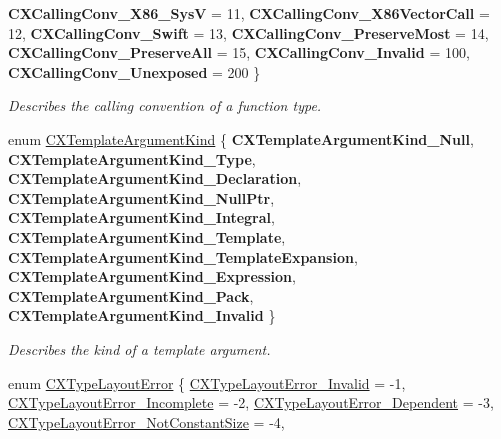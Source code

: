 \begin{DoxyCompactItemize}
{\bfseries C\+X\+Calling\+Conv\+\_\+\+X86\+\_\+SysV} = 11, 
\newline
{\bfseries C\+X\+Calling\+Conv\+\_\+\+X86\+Vector\+Call} = 12, 
{\bfseries C\+X\+Calling\+Conv\+\_\+\+Swift} = 13, 
{\bfseries C\+X\+Calling\+Conv\+\_\+\+Preserve\+Most} = 14, 
{\bfseries C\+X\+Calling\+Conv\+\_\+\+Preserve\+All} = 15, 
\newline
{\bfseries C\+X\+Calling\+Conv\+\_\+\+Invalid} = 100, 
{\bfseries C\+X\+Calling\+Conv\+\_\+\+Unexposed} = 200
 \}\begin{DoxyCompactList}\small\item\em Describes the calling convention of a function type. \end{DoxyCompactList}
\item 
enum \hyperlink{group__CINDEX__TYPES_gaf23c39e68c1fc756643583b43ee3e494}{C\+X\+Template\+Argument\+Kind} \{ \newline
{\bfseries C\+X\+Template\+Argument\+Kind\+\_\+\+Null}, 
{\bfseries C\+X\+Template\+Argument\+Kind\+\_\+\+Type}, 
{\bfseries C\+X\+Template\+Argument\+Kind\+\_\+\+Declaration}, 
{\bfseries C\+X\+Template\+Argument\+Kind\+\_\+\+Null\+Ptr}, 
\newline
{\bfseries C\+X\+Template\+Argument\+Kind\+\_\+\+Integral}, 
{\bfseries C\+X\+Template\+Argument\+Kind\+\_\+\+Template}, 
{\bfseries C\+X\+Template\+Argument\+Kind\+\_\+\+Template\+Expansion}, 
{\bfseries C\+X\+Template\+Argument\+Kind\+\_\+\+Expression}, 
\newline
{\bfseries C\+X\+Template\+Argument\+Kind\+\_\+\+Pack}, 
{\bfseries C\+X\+Template\+Argument\+Kind\+\_\+\+Invalid}
 \}\begin{DoxyCompactList}\small\item\em Describes the kind of a template argument. \end{DoxyCompactList}
\item 
enum \hyperlink{group__CINDEX__TYPES_gaaf1b95e9e7e792a08654563fef7502c1}{C\+X\+Type\+Layout\+Error} \{ \newline
\hyperlink{group__CINDEX__TYPES_ggaaf1b95e9e7e792a08654563fef7502c1a8af753af7c2bb465ffbf94112097294a}{C\+X\+Type\+Layout\+Error\+\_\+\+Invalid} = -\/1, 
\hyperlink{group__CINDEX__TYPES_ggaaf1b95e9e7e792a08654563fef7502c1a164e94efee026bd69cd70bc6034c2bb5}{C\+X\+Type\+Layout\+Error\+\_\+\+Incomplete} = -\/2, 
\hyperlink{group__CINDEX__TYPES_ggaaf1b95e9e7e792a08654563fef7502c1a1afb8a0cc940a15ecc7e660627d33405}{C\+X\+Type\+Layout\+Error\+\_\+\+Dependent} = -\/3, 
\hyperlink{group__CINDEX__TYPES_ggaaf1b95e9e7e792a08654563fef7502c1a669a4b303270bb38a2332f98db875c76}{C\+X\+Type\+Layout\+Error\+\_\+\+Not\+Constant\+Size} = -\/4, 

\end{DoxyCompactItemize}
